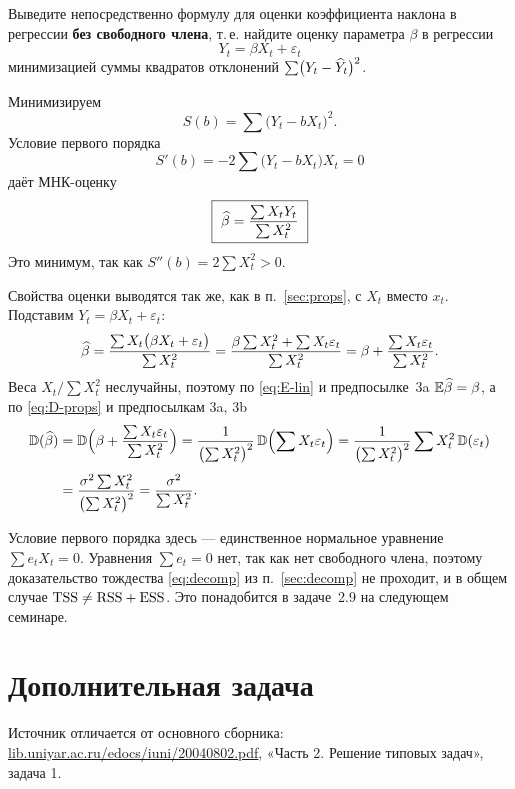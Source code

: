 Выведите непосредственно формулу для оценки коэффициента наклона в регрессии
\textbf{без свободного члена}, т.\,е. найдите оценку параметра $\beta$ в регрессии
\[
  Y_t = \beta X_t + \varepsilon_t
\]
минимизацией суммы квадратов отклонений $\sum \bigl(Y_t - \widehat{Y}_t\bigr)^2$.

\begin{solution}
Минимизируем
\[
  S(b) = \sum\bigl(Y_t - bX_t\bigr)^2 .
\]
Условие первого порядка
\[
  S'(b) = -2\sum\bigl(Y_t - bX_t\bigr)X_t = 0
\]
даёт МНК-оценку
\[
  \boxed{\ \widehat{\beta} = \frac{\sum X_tY_t}{\sum X_t^2}\ }
\]
Это минимум, так как $S''(b) = 2\sum X_t^2 > 0$.

\medskip
Свойства оценки выводятся так же, как в п.~\ref{sec:props}, с $X_t$ вместо
$x_t$. Подставим $Y_t = \beta X_t + \varepsilon_t$:
\[
  \widehat{\beta} = \frac{\sum X_t\bigl(\beta X_t + \varepsilon_t\bigr)}{\sum X_t^2}
      = \frac{\beta\sum X_t^2 + \sum X_t\varepsilon_t}{\sum X_t^2}
      = \beta + \frac{\sum X_t\varepsilon_t}{\sum X_t^2}.
\]
Веса $X_t/\sum X_t^2$ неслучайны, поэтому по \eqref{eq:E-lin} и предпосылке~3a
$\mathbb{E}\widehat{\beta} = \beta$, а по \eqref{eq:D-props} и предпосылкам 3a, 3b
\[
\begin{aligned}
  \mathbb{D}(\widehat{\beta}) &= \mathbb{D}\Bigl(\beta + \frac{\sum X_t\varepsilon_t}{\sum X_t^2}\Bigr)
           = \frac{1}{\bigl(\sum X_t^2\bigr)^2}\,\mathbb{D}\Bigl(\sum X_t\varepsilon_t\Bigr)
           = \frac{1}{\bigl(\sum X_t^2\bigr)^2}\sum X_t^2\,\mathbb{D}(\varepsilon_t) \\[4pt]
          &= \frac{\sigma^2\sum X_t^2}{\bigl(\sum X_t^2\bigr)^2}
           = \frac{\sigma^2}{\sum X_t^2}.
\end{aligned}
\]

\medskip
Условие первого порядка здесь — единственное нормальное уравнение
$\sum e_tX_t = 0$. Уравнения $\sum e_t = 0$ нет, так как нет свободного члена,
поэтому доказательство тождества \eqref{eq:decomp} из п.~\ref{sec:decomp} не
проходит, и в общем случае $\mathrm{TSS} \neq \mathrm{RSS} + \mathrm{ESS}$. Это понадобится в
задаче~2.9 на следующем семинаре.
\end{solution}

\section{Дополнительная задача}

\ifsolutions   %
\begin{remark}
\raggedright
Источник отличается от основного сборника:
\href{http://www.lib.uniyar.ac.ru/edocs/iuni/20040802.pdf}%
{lib.uniyar.ac.ru/edocs/iuni/20040802.pdf}, «Часть 2. Решение типовых задач»,
задача 1.
\end{remark}
\fi

